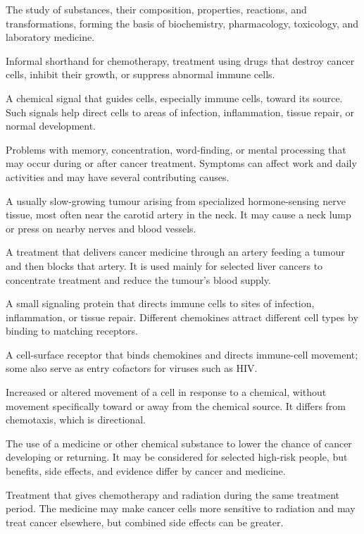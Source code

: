  The study of substances, their composition, properties, reactions, and transformations, forming the basis of biochemistry, pharmacology, toxicology, and laboratory medicine.

 Informal shorthand for chemotherapy, treatment using drugs that destroy cancer cells, inhibit their growth, or suppress abnormal immune cells.

 A chemical signal that guides cells, especially immune cells, toward its source. Such signals help direct cells to areas of infection, inflammation, tissue repair, or normal development.

 Problems with memory, concentration, word-finding, or mental processing that may occur during or after cancer treatment. Symptoms can affect work and daily activities and may have several contributing causes.

 A usually slow-growing tumour arising from specialized hormone-sensing nerve tissue, most often near the carotid artery in the neck. It may cause a neck lump or press on nearby nerves and blood vessels.

 A treatment that delivers cancer medicine through an artery feeding a tumour and then blocks that artery. It is used mainly for selected liver cancers to concentrate treatment and reduce the tumour's blood supply.

 A small signaling protein that directs immune cells to sites of infection, inflammation, or tissue repair. Different chemokines attract different cell types by binding to matching receptors.

 A cell-surface receptor that binds chemokines and directs immune-cell movement; some also serve as entry cofactors for viruses such as HIV.

 Increased or altered movement of a cell in response to a chemical, without movement specifically toward or away from the chemical source. It differs from chemotaxis, which is directional.

 The use of a medicine or other chemical substance to lower the chance of cancer developing or returning. It may be considered for selected high-risk people, but benefits, side effects, and evidence differ by cancer and medicine.

 Treatment that gives chemotherapy and radiation during the same treatment period. The medicine may make cancer cells more sensitive to radiation and may treat cancer elsewhere, but combined side effects can be greater.

